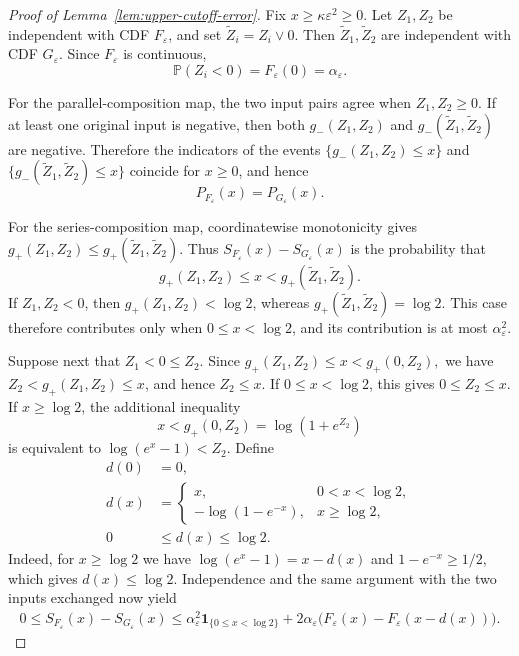 \documentclass[12pt,preprint]{amsart}
\numberwithin{equation}{section}
\theoremstyle{plain}
\theoremstyle{definition}
\newcommand{\Pp}{\mathbb P}
\newcommand{\ind}{\mathbf 1}
\begin{document}
\begin{proof}[Proof of Lemma~\ref{lem:upper-cutoff-error}]
Fix $x\ge\kappa\varepsilon^2\ge0$.  Let $Z_1,Z_2$ be
independent with CDF $F_\varepsilon$, and set
$\widetilde Z_i=Z_i\vee0$.  Then $\widetilde Z_1,\widetilde Z_2$ are
independent with CDF $G_\varepsilon$.  Since $F_\varepsilon$ is
continuous,
\[
 \Pp(Z_i<0)=F_\varepsilon(0)=\alpha_\varepsilon.
\]

For the parallel-composition map, the two input pairs agree when $Z_1,Z_2\ge0$.
If at least one original input is negative, then both
$g_-(Z_1,Z_2)$ and
$g_-(\widetilde Z_1,\widetilde Z_2)$ are negative.  Therefore the indicators
of the events $\{g_-(Z_1,Z_2)\le x\}$ and
$\{g_-(\widetilde Z_1,\widetilde Z_2)\le x\}$ coincide for $x\ge0$, and hence
\[
 P_{F_\varepsilon}(x)=P_{G_\varepsilon}(x).
\]

For the series-composition map, coordinatewise monotonicity gives
\(
 g_+(Z_1,Z_2)
 \le g_+(\widetilde Z_1,\widetilde Z_2).
\)
Thus
$S_{F_\varepsilon}(x)-S_{G_\varepsilon}(x)$ is the probability that
\[
 g_+(Z_1,Z_2)\le x
 <g_+(\widetilde Z_1,\widetilde Z_2).
\]
If $Z_1,Z_2<0$, then $g_+(Z_1,Z_2)<\log2$, whereas
$g_+(\widetilde Z_1,\widetilde Z_2)=\log2$.  This case therefore
contributes only when $0\le x<\log2$, and its contribution is at most
$\alpha_\varepsilon^2$.

Suppose next that $Z_1<0\le Z_2$.  Since
$g_+(Z_1,Z_2)\le x<g_+(0,Z_2),$
we have
$Z_2<g_+(Z_1,Z_2)\le x$, and hence $Z_2\le x$.  If
$0\le x<\log2$, this gives
$0\le Z_2\le x$.  If $x\ge\log2$, the additional inequality
\[
 x<g_+(0,Z_2)=\log(1+e^{Z_2})
\]
is equivalent to $\log(e^x-1)<Z_2$.  Define
\begin{equation*}
\begin{aligned}
 d(0)&=0,\\
 d(x)&=
 \begin{cases}
  x,&0<x<\log2,\\
  -\log(1-e^{-x}),&x\ge\log2,
 \end{cases}\\
 0&\le d(x)\le\log2.
\end{aligned}
\end{equation*}
Indeed, for $x\ge\log2$ we have
$\log(e^x-1)=x-d(x)$ and $1-e^{-x}\ge1/2$, which gives
$d(x)\le\log2$.  Independence and the same argument with the two
inputs exchanged now yield
\begin{equation*}
\begin{aligned}
 0\le S_{F_\varepsilon}(x)-S_{G_\varepsilon}(x)
 \le \alpha_\varepsilon^2\ind_{\{0\le x<\log2\}}+2\alpha_\varepsilon
 \bigl(F_\varepsilon(x)-F_\varepsilon(x-d(x))\bigr).
\end{aligned}
\end{equation*}


\end{proof}
\end{document}
